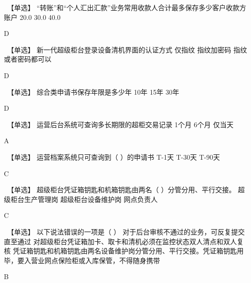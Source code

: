 \documentclass[kindlepaper]{BHCexam4kindle}
\begin{document}
\begin{questions}
\qs　【单选】 “转账”和“个人汇出汇款”业务常用收款人合计最多保存多少客户收款方账户 \xx
{} {  20.0 } { 30.0 } { 40.0 }
\begin{solution} D \end{solution}
\qs　【单选】 新一代超级柜台登录设备清机界面的认证方式 \xx
{} {  仅指纹 } { 指纹加密码 } { 指纹或者密码都可以 }
\begin{solution} D \end{solution}
\qs　【单选】 综合类申请书保存年限是多少年 \xx
{} {  10年 } { 15年 } { 30年 }
\begin{solution} D \end{solution}
\qs　【单选】 运营后台系统可查询多长期限的超柜交易记录 \xx
{} {  1个月 } { 6个月 } { 仅当天 }
\begin{solution} A \end{solution}
\qs　【单选】 运营档案系统只可查询到（ ）的申请书 \xx
{} {  T-1天 } { T-30天 } { T-90天 }
\begin{solution} C \end{solution}
\qs　【单选】 超级柜台凭证箱钥匙和机箱钥匙由两名（ ）分管分用、平行交接。 \xx
{} {  超级柜台生产管理岗 } { 超级柜台设备维护岗 } { 网点负责人 }
\begin{solution} C \end{solution}
\qs　【单选】 以下说法错误的一项是（ ） \xx
{} {  对于后台审核不通过的业务，可反复提交直至通过 } { 对超级柜台凭证箱加卡、取卡和清机必须在监控状态双人清点和双人复核 } { 凭证箱钥匙和机箱钥匙由两名设备维护岗分管分用、平行交接。凭证箱钥匙用毕，要入营业网点保险柜或入库保管，不得随身携带 }
\begin{solution} B \end{solution}

\end{questions}
\end{document}
